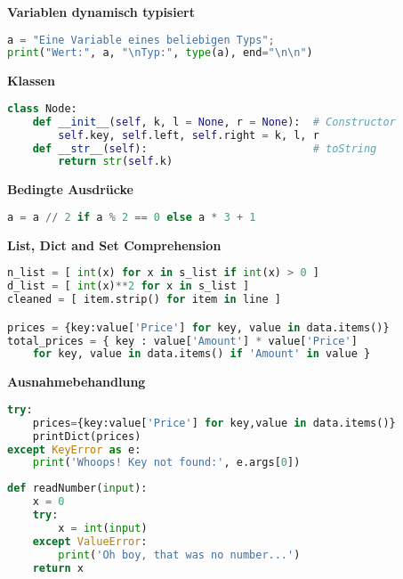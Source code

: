 \begin{sectionbox}
\textbf{Variablen dynamisch typisiert}\vspace{-4px}
\begin{lstlisting}[language=Python]
a = "Eine Variable eines beliebigen Typs";
print("Wert:", a, "\nTyp:", type(a), end="\n\n")
\end{lstlisting}


\textbf{Klassen}\vspace{-4px}
\begin{lstlisting}[language=Python]
class Node:
    def __init__(self, k, l = None, r = None):  # Constructor
        self.key, self.left, self.right = k, l, r
    def __str__(self):                          # toString
        return str(self.k)
\end{lstlisting}

\textbf{Bedingte Ausdrücke}\vspace{-4px}
\begin{lstlisting}[language=Python]
a = a // 2 if a % 2 == 0 else a * 3 + 1
\end{lstlisting}

\textbf{List, Dict and Set Comprehension}\vspace{-4px}
\begin{lstlisting}[language=Python]
n_list = [ int(x) for x in s_list if int(x) > 0 ]
d_list = [ int(x)**2 for x in s_list ]
cleaned = [ item.strip() for item in line ]

prices = {key:value['Price'] for key, value in data.items()}
total_prices = { key : value['Amount'] * value['Price'] 
    for key, value in data.items() if 'Amount' in value }
\end{lstlisting}

\textbf{Ausnahmebehandlung}\vspace{-4px}
\begin{lstlisting}[language=Python]
try:
    prices={key:value['Price'] for key,value in data.items()}
    printDict(prices)
except KeyError as e:
    print('Whoops! Key not found:', e.args[0])
\end{lstlisting}\vspace{-6px}

\begin{lstlisting}[language=Python]
def readNumber(input):
    x = 0
    try:
        x = int(input)
    except ValueError:
        print('Oh boy, that was no number...')
    return x
\end{lstlisting}\vspace{-6px}

\end{sectionbox}